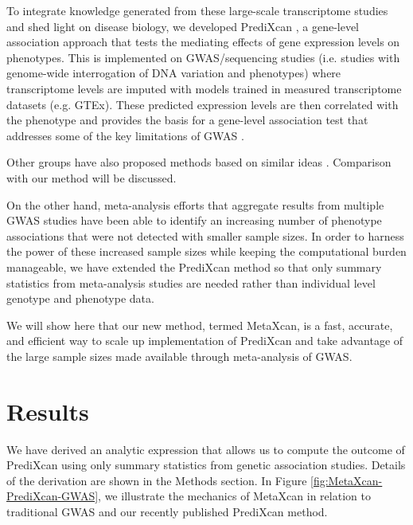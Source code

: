 \documentclass[10pt]{article}
\begin{document}
To integrate knowledge generated from these large-scale transcriptome studies and shed light on disease biology, we developed PrediXcan \cite{Gamazon2015}, a gene-level association approach that tests the mediating effects of gene expression levels on phenotypes. This is implemented on GWAS/sequencing studies (i.e. studies with genome-wide interrogation of DNA variation and phenotypes) where transcriptome levels are imputed with models trained in measured transcriptome datasets (e.g. GTEx). These predicted expression levels are then correlated with the phenotype and provides the basis for a gene-level association test that addresses some of the key limitations of GWAS \cite{Gamazon2015}.

Other groups have also proposed methods based on similar ideas \cite{Gusev2016}. Comparison with our method will be discussed.

On the other hand, meta-analysis efforts that aggregate results from multiple GWAS studies have been able to identify an increasing number of phenotype associations that were not detected with smaller sample sizes. In order to harness the power of these increased sample sizes while keeping the computational burden manageable, we have extended the PrediXcan method so that only summary statistics from meta-analysis studies are needed rather than individual level genotype and phenotype data. 

We will show here that our new method, termed MetaXcan, is a fast, accurate, and efficient way to scale up implementation of PrediXcan and take advantage of the large sample sizes made available through meta-analysis of GWAS.\\

\section*{Results}

We have derived an analytic expression that allows us to compute the outcome of PrediXcan using only summary statistics from genetic association studies. Details of the derivation are shown in the Methods section. 
In Figure \ref{fig:MetaXcan-PrediXcan-GWAS}, we illustrate the mechanics of MetaXcan in relation to traditional GWAS and our recently published PrediXcan method.
\end{document}
